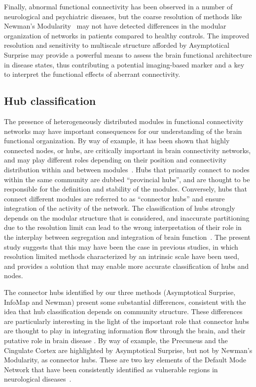 Finally, abnormal functional connectivity has been observed in a number of neurological and psychiatric diseases, but the coarse resolution of methods like Newman's Modularity~\cite{fornito2015} may not have detected differences in the modular organization of networks in patients compared to healthy controls.
The improved resolution and sensitivity to multiscale structure afforded by Asymptotical Surprise may provide a powerful means to assess the brain functional architecture in disease states, thus contributing a potential imaging-based marker and a key to interpret the functional effects of aberrant connectivity.
\subsection{Hub classification}
The presence of heterogeneously distributed modules in functional connectivity networks may have important consequences for our understanding of the brain functional organization.
By way of example, it has been shown that highly connected nodes, or hubs, are critically important in brain connectivity networks, and may play different roles depending on their position and connectivity distribution within and between modules~\cite{bullmore2009}.
Hubs that primarily connect to nodes within the same community are dubbed “provincial hubs”, and are thought to be responsible for the definition and stability of the modules.
Conversely, hubs that connect different modules are referred to as “connector hubs” and ensure integration of the activity of the network.
The classification of hubs strongly depends on the modular structure that is considered, and inaccurate partitioning due to the resolution limit can lead to the wrong interpretation of their role in the interplay between segregation and integration of brain function~\cite{bullmore2009}.
The present study suggests that this may have been the case in previous studies, in which resolution limited methods characterized by an intrinsic scale have been used, and provides a solution that may enable more accurate classification of hubs and nodes.

The connector hubs identified by our three methods (Asymptotical Surprise, InfoMap and Newman) present some substantial differences, consistent with the idea that hub classification depends on community structure.
These differences are particularly interesting in the light of the important role that connector hubs are thought to play in integrating information flow through the brain, and their putative role in brain disease \cite{crossley2014,stam2014}.
By way of example, the Precuneus and the Cingulate Cortex are highlighted by Asymptotical Surprise, but not by Newman's Modularity, as connector hubs.
These are two key elements of the Default Mode Network that have been consistently identified as vulnerable regions in neurological diseases~\cite{vandenheuvel2013a,buckner2009}.

